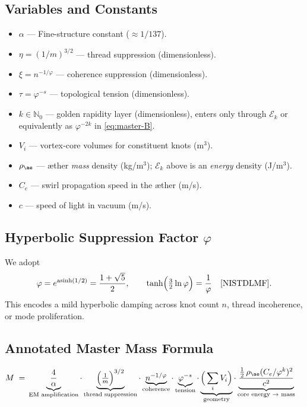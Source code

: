 \documentclass[12pt]{article}
\begin{document}
  \subsection*{Variables and Constants}
  \begin{itemize}
      \item \(\alpha\) — Fine-structure constant (\(\approx 1/137\)).
      \item \(\eta=(1/m)^{3/2}\) — thread suppression (dimensionless).
      \item \(\xi=n^{-1/\varphi}\) — coherence suppression (dimensionless).
      \item \(\tau=\varphi^{-s}\) — topological tension (dimensionless).
      \item \(k\in\mathbb{N}_0\) — golden rapidity layer (dimensionless), enters only through \(\mathcal{E}_k\) or equivalently as \(\varphi^{-2k}\) in \eqref{eq:master-B}.
      \item \(V_i\) — vortex‐core volumes for constituent knots (m\(^3\)).
      \item \(\rho_{\ae}\) — æther \emph{mass} density (kg/m\(^3\)); \(\mathcal{E}_k\) above is an \emph{energy} density (J/m\(^3\)).
      \item \(C_e\) — swirl propagation speed in the æther (m/s).
      \item \(c\) — speed of light in vacuum (m/s).
  \end{itemize}

  \subsection*{Hyperbolic Suppression Factor \(\varphi\)}
  We adopt
  \begin{equation}
      \varphi=e^{\operatorname{asinh}(1/2)}=\frac{1+\sqrt{5}}{2},\qquad
      \tanh\!\Big(\tfrac{3}{2}\ln\varphi\Big)=\frac{1}{\varphi}\quad\text{\cite{NISTDLMF}}.
  \end{equation}
  This encodes a mild hyperbolic damping across knot count \(n\), thread incoherence, or mode proliferation.

  \subsection*{Annotated Master Mass Formula}
  \begin{align*}
      M \;=\;
      &\underbrace{\frac{4}{\alpha}}_{\text{EM amplification}}
      \cdot
      \underbrace{\Big(\tfrac{1}{m}\Big)^{3/2}}_{\text{thread suppression}}
      \cdot
      \underbrace{n^{-1/\varphi}}_{\text{coherence}}
      \cdot
      \underbrace{\varphi^{-s}}_{\text{tension}}
      \cdot
      \underbrace{\Big(\sum_i V_i\Big)}_{\text{geometry}}
      \cdot
      \underbrace{\frac{\tfrac12\,\rho_{\ae}(C_e/\varphi^k)^2}{c^2}}_{\text{core energy }\to \text{ mass}}
  \end{align*}
\end{document}
